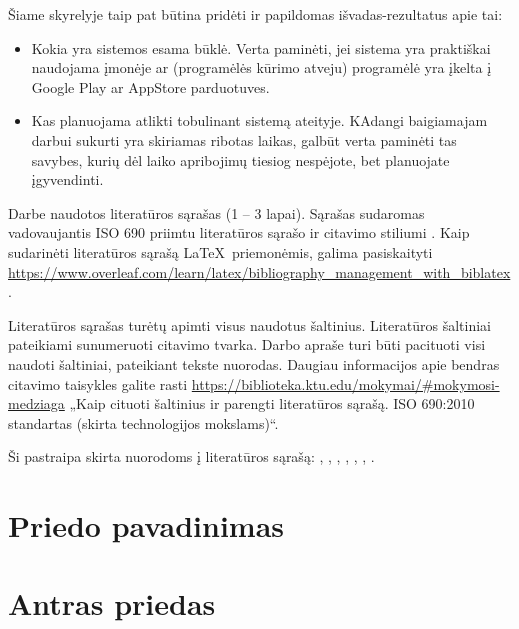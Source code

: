 \documentclass{ktuthesis}
\begin{document}
  Šiame skyrelyje taip pat būtina pridėti ir papildomas išvadas-rezultatus apie tai:
  \begin{itemize}[label={--}]
    \item Kokia yra sistemos esama būklė. Verta paminėti, jei sistema yra praktiškai naudojama įmonėje ar (programėlės kūrimo atveju) programėlė yra įkelta
    į Google Play ar AppStore parduotuves.
    \item Kas planuojama atlikti tobulinant sistemą ateityje. KAdangi baigiamajam darbui sukurti yra skiriamas ribotas laikas, galbūt verta paminėti tas savybes,
    kurių dėl laiko apribojimų tiesiog nespėjote, bet planuojate įgyvendinti.
  \end{itemize}

  \clearpage
  \printbibliography[title={\hfil\fontsize{12}{15}\selectfont{Literatūros sąrašas}}]

  Darbe naudotos literatūros sąrašas (1 – 3 lapai). Sąrašas sudaromas vadovaujantis ISO 690 priimtu literatūros sąrašo ir citavimo stiliumi \cite{rastodarbai}.
  Kaip sudarinėti literatūros sąrašą \LaTeX \ priemonėmis, galima pasiskaityti \url{https://www.overleaf.com/learn/latex/bibliography_management_with_biblatex}.

  Literatūros sąrašas turėtų apimti visus naudotus šaltinius. Literatūros šaltiniai pateikiami sunumeruoti citavimo tvarka.
  Darbo apraše turi būti pacituoti visi naudoti šaltiniai, pateikiant tekste nuorodas. Daugiau informacijos apie bendras citavimo taisykles galite
  rasti \url{https://biblioteka.ktu.edu/mokymai/#mokymosi-medziaga} „Kaip cituoti šaltinius ir parengti literatūros sąrašą. ISO 690:2010 standartas
  (skirta technologijos mokslams)“.

  Ši pastraipa skirta nuorodoms į literatūros sąrašą: \cite{litnet}, \cite{ontologies}, \cite{valstybestarnyba}, \cite{spaudosdraudimas}, \cite{krastoapsauga}, \cite{citationguide}, \cite{velomobilis}.

  \newpage

  \appendix
  \renewcommand{\thesection}{\arabic{section}}

  \section{Priedo pavadinimas}

  \section{Antras priedas}
\end{document}
